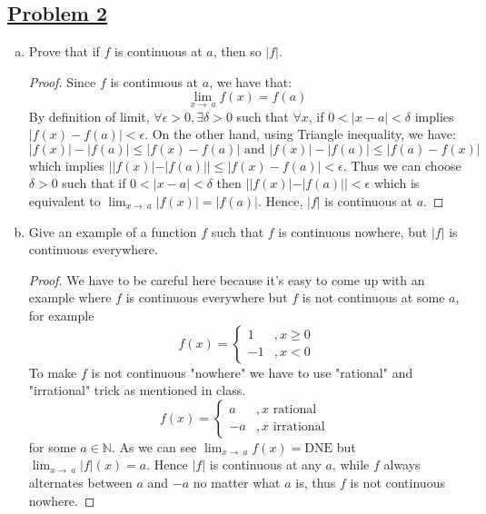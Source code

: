 \documentclass[10pt,letterpaper]{article}
\begin{document}
	\subsection*{{\color{purple}\underline{Problem 2}}}
	\begin{enumerate}[(a)]
	\item Prove that if $f$ is continuous at $a$, then so $|f|$.
	\begin{proof}
		Since $f$ is continuous at $a$, we have that:
		$$\displaystyle\lim_{x\to\ a}f(x) = f(a)$$
		By definition of limit, $\forall \epsilon > 0, \exists \delta > 0$ such that $\forall x$,
		if $0 < |x - a| < \delta$ implies $|f(x) - f(a)| < \epsilon$. On the other hand,
		using Triangle inequality, we have:
		$$|f(x)| - |f(a)| \leq |f(x) - f(a)| \text{ and } |f(x)| - |f(a)| \leq |f(a) - f(x)|$$
		which implies $||f(x)| - |f(a)|| \leq |f(x) - f(a)| < \epsilon$. Thus we can choose
		$\delta > 0$ such that if $0 < |x - a| < \delta$ then $||f(x)| - |f(a)|| < \epsilon$
		which is equivalent to $\displaystyle\lim_{x\to\ a}|f(x)| = |f(a)|$. Hence,
		$|f|$ is continuous at $a$. 
	\end{proof}
	\item Give an example of a function $f$ such that $f$ is continuous nowhere, but $|f|$
	is continuous everywhere.
	\begin{proof}
	We have to be careful here because it's easy to come up with an example where $f$ is
	continuous everywhere but $f$ is not continuous at some $a$, for example
	$$
	f(x) = 
	\begin{cases}
		1  &, x \geq 0  \\
		-1 &, x < 0
	\end{cases}
	$$
	To make $f$ is not continuous "nowhere" we have to use "rational" and 
	"irrational" trick as mentioned in class.
	$$
	f(x) = 
	\begin{cases}
		a  &, x \text{ rational } \\
		-a &, x \text{ irrational }
	\end{cases}
	$$
	for some $a \in \mathbb{N}$.
	As we can see $\displaystyle\lim_{x\to\ a}f(x) = \text{DNE}$ but $\displaystyle\lim_{x\to\ a}|f|(x) = a$.
	Hence $|f|$ is continuous at any $a$, while $f$ always alternates between $a$ and $-a$ no matter
	what $a$ is, thus $f$ is not continuous nowhere. 	
	

\end{proof}
\end{enumerate}
\end{document}

